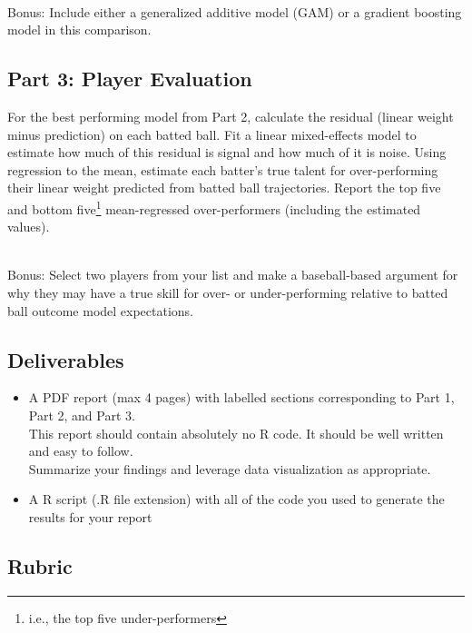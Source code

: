 \documentclass{article}
\begin{document}
      ~\\
      {\sc Bonus:} Include either a generalized additive model (GAM) or a gradient boosting model in this comparison.

    \subsection*{\sc Part 3: Player Evaluation}

      For the best performing model from Part 2, calculate the residual (linear weight minus prediction) on each batted ball. Fit a linear mixed-effects model to estimate how much of this residual is signal and how much of it is noise. Using regression to the mean, estimate each batter's true talent for over-performing their linear weight predicted from batted ball trajectories. Report the top five and bottom five\footnote{i.e., the top five under-performers} mean-regressed over-performers (including the estimated values).

      ~\\
      {\sc Bonus:} Select two players from your list and make a baseball-based argument for why they may have a true skill for over- or under-performing relative to batted ball outcome model expectations.

    \subsection*{\sc Deliverables}

      \begin{itemize}
        \item A PDF report (max 4 pages) with labelled sections corresponding to Part 1, Part 2, and Part 3.\\
        This report should contain absolutely no R code. It should be well written and easy to follow.\\
        Summarize your findings and leverage data visualization as appropriate.
        \item A R script (.R file extension) with all of the code you used to generate the results for your report
      \end{itemize}

    \newpage

    \subsection*{\sc Rubric}
\end{document}
